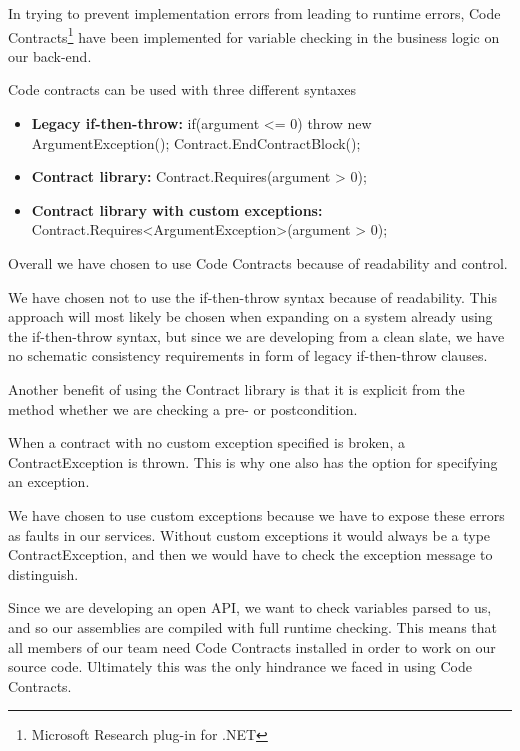 \documentclass[../report.tex]{subfiles}
\begin{document}
In trying to prevent implementation errors from leading to runtime errors, Code Contracts\footnote{Microsoft Research plug-in for .NET} have been implemented for variable checking in the business logic on our back-end.

Code contracts can be used with three different syntaxes

\begin{itemize}
\item \textbf{Legacy if-then-throw:}
\subitem if(argument <= 0) throw new ArgumentException();  
\subitem Contract.EndContractBlock();

\item \textbf{Contract library:}
\subitem Contract.Requires(argument > 0);

\item \textbf{Contract library with custom exceptions:}
\subitem Contract.Requires<ArgumentException>(argument > 0);
\end{itemize}

Overall we have chosen to use Code Contracts because of readability and control.

We have chosen not to use the if-then-throw syntax because of readability. This approach will most likely be chosen when expanding on a system already using the if-then-throw syntax, but since we are developing from a clean slate, we have no schematic consistency requirements in form of legacy if-then-throw clauses.

Another benefit of using the Contract library is that it is explicit from the method whether we are checking a pre- or postcondition.

When a contract with no custom exception specified is broken, a ContractException is thrown. This is why one also has the option for specifying an exception.

We have chosen to use custom exceptions because we have to expose these errors as faults in our services. Without custom exceptions it would always be a type ContractException, and then we would have to check the exception message to distinguish.

Since we are developing an open API, we want to check variables parsed to us, and so our assemblies are compiled with full runtime checking. This means that all members of our team need Code Contracts installed in order to work on our source code. Ultimately this was the only hindrance we faced in using Code Contracts.
\end{document}
